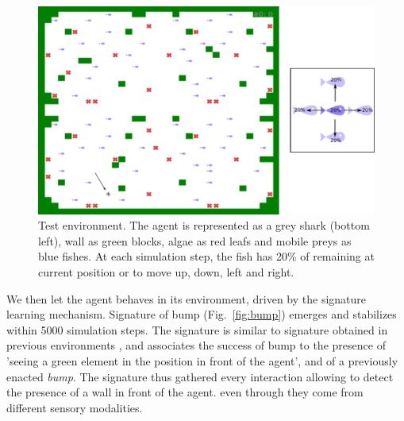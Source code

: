 \documentclass[conference]{IEEEtran}
\makeatletter
\let\cite\relax
\DeclareRobustCommand{\cite}{%
	\let\new@cite@pre\@gobble
	\@ifnextchar[\new@cite{\@citex[]}}
\def\new@cite[#1]{\@ifnextchar[{\new@citea{#1}}{\@citex[#1]}}
\def\new@citea#1{\def\new@cite@pre{#1}\@citex}
\makeatother
\begin{document}
\begin{figure}[htbp]
\centerline{\includegraphics[scale=0.28]{img/environment.pdf}}
\caption{Test environment. The agent is represented as a grey shark (bottom left), wall as green blocks, algae as red leafs and mobile preys as blue fishes. At each simulation step, the fish has 20\% of remaining at current position or to move up, down, left and right. 
}
\label{fig:environment}
\end{figure}




We then let the agent behaves in its environment, driven by the signature learning mechanism. Signature of bump (Fig.~\ref{fig:bump}) emerges and stabilizes within 5000 simulation steps. The signature is similar to signature obtained in previous environments \cite{gay:space}\cite{gay:dynamic}, and associates the success of bump to the presence of 'seeing a green element in the position in front of the agent', and of a previously enacted \textit{bump}. The signature thus gathered every interaction allowing to detect the presence of a wall in front of the agent. %
even through they come from different sensory modalities. %
\end{document}
